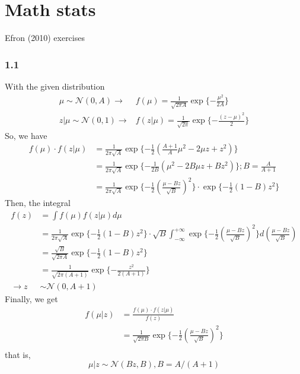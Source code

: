 \documentclass{article}\usepackage{graphicx, color}
\begin{document}
\section*{Math stats}
Efron (2010) exercises

\subsubsection*{1.1}
With the given distribution
\begin{displaymath}
\begin{split}
\mu \sim \mathcal{N}(0,A) \rightarrow  &
f(\mu) = \frac{1}{\sqrt{2 \pi A}} \exp\{-\frac{\mu^2}{2A}\}  \\
z|\mu \sim \mathcal{N}(0,1) \rightarrow & 
f(z|\mu) = \frac{1}{\sqrt{2 \pi}} \exp\{-\frac{(z-\mu)^2}{2}\}
\end{split}
\end{displaymath}
So, we have
\begin{displaymath}
\begin{split}
f(\mu)\cdot f(z|\mu) &= \frac{1}{2\pi \sqrt{A}} \exp \{-\frac{1}{2}
(\frac{A+1}{A}\mu^2 - 2\mu z + z^2)\} \\
& = \frac{1}{2\pi \sqrt{A}} \exp \{-\frac{1}{2B}
(\mu^2 - 2B\mu z + Bz^2)\} ;       B=\frac{A}{A+1} \\
& = \frac{1}{2\pi \sqrt{A}} \exp \{-\frac{1}{2} (\frac{\mu -  Bz}{\sqrt{B}})^2\} 
\cdot \exp \{-\frac{1}{2} (1-B)z^2 \} 
\end{split}
\end{displaymath}
Then, the integral
\begin{displaymath}
\begin{split}
f(z) &= \int {f(\mu)f(z|\mu)} d\mu \\
& = \frac{1}{2\pi \sqrt{A}} \exp \{-\frac{1}{2} (1-B)z^2 \} 
\cdot \sqrt{B} \int_{-\infty}^{+\infty}  
\exp \{-\frac{1}{2} (\frac{\mu -  Bz}{\sqrt{B}})^2\} 
d (\frac{\mu -  Bz}{\sqrt{B}}) \\
& = \frac{\sqrt{B}}{\sqrt{2\pi A}} \exp \{-\frac{1}{2} (1-B)z^2 \} \\
& = \frac{1}{\sqrt{2\pi (A+1)}} \exp \{ -\frac{z^2}{2(A+1)} \} \\
\rightarrow  z & \sim \mathcal{N}(0,A+1)
\end{split}
\end{displaymath}
Finally, we get
\begin{displaymath}
\begin{split}
f(\mu |z) &= \frac{f(\mu)\cdot f(z|\mu)}{f(z)} \\
& = \frac{1}{\sqrt{2\pi B}} \exp \{-\frac{1}{2} (\frac{\mu -  Bz}{\sqrt{B}})^2\} \\
\end{split}
\end{displaymath}
that is, 
\begin{displaymath}
\mu |z \sim \mathcal{N}(Bz, B) , B= A/(A+1)
\end{displaymath}
\end{document}
